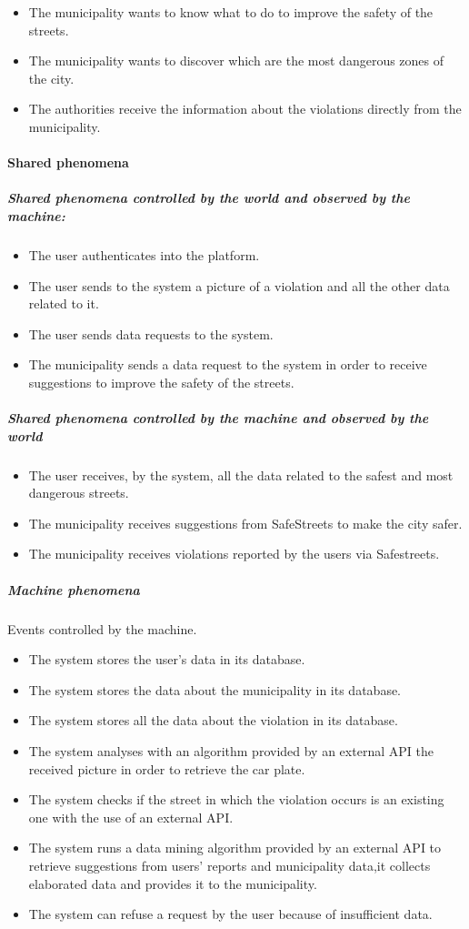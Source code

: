 \documentclass[titlepage]{article}
\begin{document}
\begin{itemize}
	\item The municipality wants to know what to do to 				improve the safety of the streets.
	\item The municipality wants to discover which are the most
	dangerous zones of the city.
	\item The authorities receive the information about the violations directly from the municipality. 
\end{itemize}
 
\paragraph{Shared phenomena }
\subparagraph{Shared phenomena controlled by the world and observed by the machine: }
\begin{itemize}
    \item The user authenticates into the platform.
 	\item The user sends to the system a picture of a            	violation and all the other data related to it.
 	\item The user sends data requests to the system.
	\item The municipality sends a data request to the system 		  in order to receive suggestions to improve the safety of the streets.
\end{itemize}
\subparagraph{Shared phenomena controlled by the machine and  			observed by the world }
\begin{itemize}
	\item The user receives, by the system, all the data 			related to the safest and most dangerous streets.
	\item The municipality receives suggestions from SafeStreets to make the city safer.
	\item The municipality receives violations reported by the users via Safestreets.
	
\end{itemize}
\subparagraph{Machine phenomena\\}
Events controlled by the machine.
\begin{itemize}
	\item The system stores the user's data in its database.
	\item The system stores the data about the 					municipality in its database.
	\item The system stores all the data about the violation in its database.
	\item The system analyses with an algorithm provided by an external API the received picture in order to retrieve the car plate.
	\item The system checks if the street in which the 				violation occurs is an existing one with the use of an external API.
	\item The system runs a data mining algorithm provided by an external API to retrieve suggestions from users' reports and municipality data,it collects elaborated data and provides it to the municipality.
	\item The system can refuse a request by the user because of insufficient data.
\end{itemize}
\end{document}

